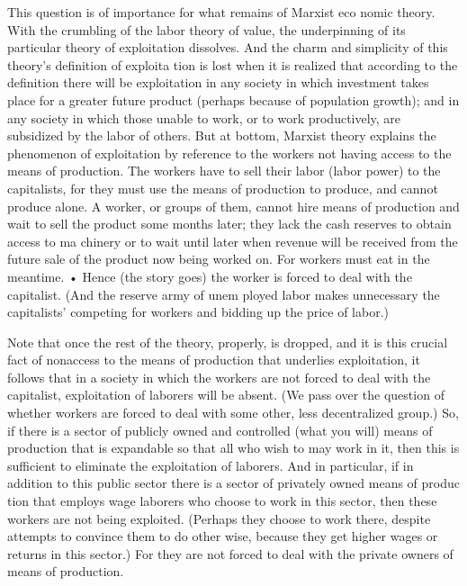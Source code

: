 \documentclass[11pt,openany]{book}
\begin{document}
This question is of importance for what remains of Marxist eco nomic theory. With the crumbling of the labor theory of value, the underpinning of its particular theory of exploitation dissolves. And the charm and simplicity of this theory's definition of exploita tion is lost when it is realized that according to the definition there will be exploitation in any society in which investment takes place for a greater future product (perhaps because of population growth); and in any society in which those unable to work, or to work productively, are subsidized by the labor of others. But at bottom, Marxist theory explains the phenomenon of exploitation by reference to the workers not having access to the means of production. The workers have to sell their labor (labor power) to the capitalists, for they must use the means of production to produce, and cannot produce alone. A worker, or groups of them, cannot hire means of production and wait to sell the product some months later; they lack the cash reserves to obtain access to ma chinery or to wait until later when revenue will be received from the future sale of the product now being worked on. For workers must eat in the meantime. • Hence (the story goes) the worker is forced to deal with the capitalist. (And the reserve army of unem ployed labor makes unnecessary the capitalists' competing for workers and bidding up the price of labor.) 

Note that once the rest of the theory, properly, is dropped, and it is this crucial fact of nonaccess to the means of production that underlies exploitation, it follows that in a society in which the workers are not forced to deal with the capitalist, exploitation of laborers will be absent. (We pass over the question of whether workers are forced to deal with some other, less decentralized group.) So, if there is a sector of publicly owned and controlled (what you will) means of production that is expandable so that all who wish to may work in it, then this is sufficient to eliminate the exploitation of laborers. And in particular, if in addition to this public sector there is a sector of privately owned means of produc tion that employs wage laborers who choose to work in this sector, then these workers are not being exploited. (Perhaps they choose to work there, despite attempts to convince them to do other wise, because they get higher wages or returns in this sector.) For they are not forced to deal with the private owners of means of production. 
\end{document}
